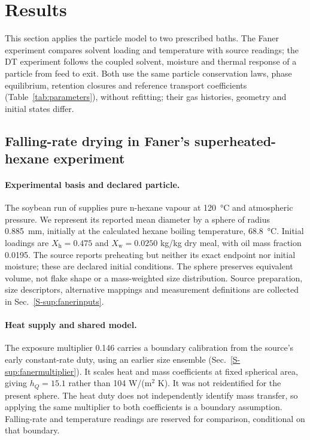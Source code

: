 \section{Results}\label{sec:validation}
This section applies the particle model to two prescribed baths. The
Faner experiment compares solvent loading and temperature with source
readings; the DT experiment follows the coupled solvent, moisture and
thermal response of a particle from feed to exit. Both use the same
particle conservation laws, phase equilibrium, retention closures and
reference transport coefficients (Table~\ref{tab:parameters}), without
refitting; their gas histories, geometry and initial states differ.

\subsection{Falling-rate drying in Faner's superheated-hexane experiment}
\label{sec:validation:journalmarch}\label{sec:validation:fanermarch}
\label{sec:validation:faner}\label{sec:validation:hexanebp}\label{sec:results:lumpedlaw}
\paragraph{Experimental basis and declared particle.}
The soybean run of \citet{faner2019kinetics} supplies pure n-hexane vapour
at \SI{120}{\celsius} and atmospheric pressure. We represent its reported
mean diameter by a sphere of radius \SI{0.885}{\milli\metre}, initially at
the calculated hexane boiling temperature, \SI{68.8}{\celsius}.
Initial loadings are $X_{\mathrm h}=0.475$ and $X_{\mathrm w}=0.0250$
kg/kg dry meal, with oil mass fraction 0.0195. The source reports
preheating but neither its exact endpoint nor initial moisture; these are
declared initial conditions. The sphere preserves equivalent volume, not
flake shape or a mass-weighted size distribution. Source preparation,
size descriptors, alternative mappings and measurement definitions are
collected in Sec.~\ref*{S-sup:fanerinputs}.

\paragraph{Heat supply and shared model.}
The exposure multiplier 0.146 carries a boundary calibration from the
source's early constant-rate duty, using an earlier size ensemble
(Sec.~\ref*{S-sup:fanermultiplier}). It scales heat and mass coefficients
at fixed spherical area, giving $h_Q=15.1$ rather than 104 W/(m$^2$ K).
It was not reidentified for the present sphere. The heat duty does not
independently identify mass transfer, so applying the same multiplier to
both coefficients is a boundary assumption. Falling-rate and temperature
readings are reserved for comparison, conditional on that boundary.

